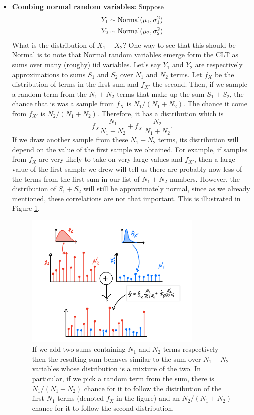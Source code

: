 \begin{itemize}
 \item {\bf Combing normal random variables:} Suppose
 \begin{align*}
Y_1 &\sim {\rm Normal}(\mu_1,\sigma_1^2)\\
Y_2 &\sim {\rm Normal}(\mu_2,\sigma_2^2)\\
\end{align*}
What is the distribution of $X_1+X_2$? One way to see that this should be Normal is to note that Normal random variables emerge form the CLT as sums over many (roughy) iid variables. Let's say $Y_1$ and $Y_2$ are respectively approximations to sums $S_1$ and $S_2$ over $N_1$ and $N_2$ terms. Let $f_X$ be the distribution of terms in the first sum and $f_{X'}$ the second. Then, if we sample a random term from the $N_1+N_2$ terms that make up the sum $S_1+S_2$, the chance that is was a sample from $f_{X}$ is $N_1/(N_1+N_2)$. The chance it come from $f_{X'}$ is $N_2/(N_1+N_2)$. Therefore, it has a distribution which is 
\begin{equation*}
f_X\frac{N_1}{N_1+N_2} + f_{X'}\frac{N_2}{N_1+N_2}.
\end{equation*}
If we draw another sample from these $N_1+N_2$ terms, its distribution will depend on the value of the first sample we obtained. For example, if samples from $f_X$ are very likely to take on very large values and $f_{X'}$, then a large value of the first sample we drew will tell us there are probably now less of the terms from the first sum in our list of $N_1+N_2$ numbers. However, the distribution of $S_1+S_2$ will still be approximately normal, since as we already mentioned, these correlations are not that important.  This is illustrated in Figure \ref{fig:clt_notiid}. 


\begin{figure}[h]
\centering
\includegraphics[width=0.8\textwidth]{./../figures/clt_notiid}
\caption{If we add two sums containing $N_1$ and $N_2$ terms respectively then the resulting sum behaves similar to the sum over $N_1 + N_2$ variables whose distribution is a mixture of the two. In particular, if we pick a random term from the sum, there is $N_1/(N_1+N_2)$ chance for it to follow the distribution of the first $N_1$ terms (denoted $f_X$ in the figure) and an $N_2/(N_1+N_2)$ chance for it to follow the second distribution.  }\label{fig:clt_notiid}
\end{figure}




\end{itemize}
